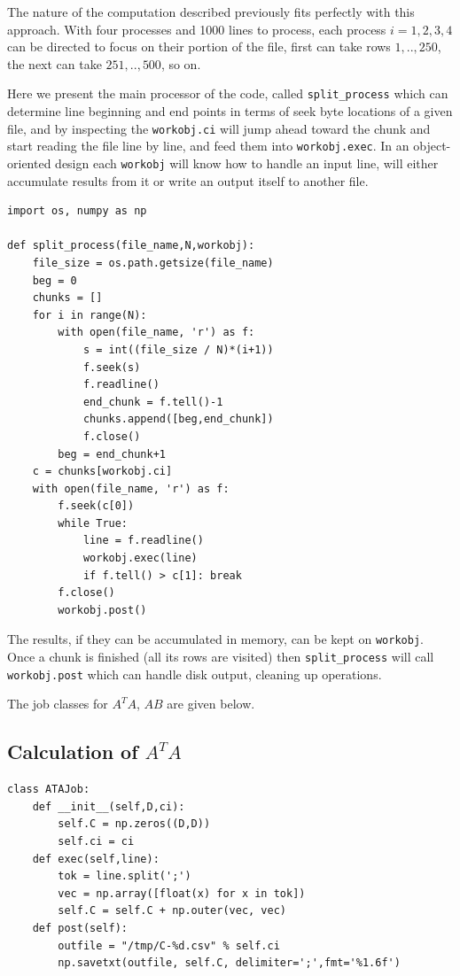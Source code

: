 \documentclass{article}
\begin{document}
The nature of the computation described previously fits perfectly with this
approach. With four processes and 1000 lines to process, each process
$i=1,2,3,4$ can be directed to focus on their portion of the file, first can
take rows $1,..,250$, the next can take $251,..,500$, so on.

Here we present the main processor of the code, called \verb!split_process!
which can determine line beginning and end points in terms of seek byte
locations of a given file, and by inspecting the \verb!workobj.ci! will
jump ahead toward the chunk and start reading the file line by line, and
feed them into \verb!workobj.exec!. In an object-oriented design each
\verb!workobj! will know how to handle an input line, will either accumulate
results from it or write an output itself to another file.

\begin{verbatim}
import os, numpy as np

def split_process(file_name,N,workobj):
    file_size = os.path.getsize(file_name)
    beg = 0
    chunks = []
    for i in range(N):
        with open(file_name, 'r') as f:
            s = int((file_size / N)*(i+1))
            f.seek(s)
            f.readline()
            end_chunk = f.tell()-1
            chunks.append([beg,end_chunk])
            f.close()
        beg = end_chunk+1
    c = chunks[workobj.ci]
    with open(file_name, 'r') as f:
        f.seek(c[0])
        while True:
            line = f.readline()
            workobj.exec(line)
            if f.tell() > c[1]: break
        f.close()
        workobj.post()
\end{verbatim}

The results, if they can be accumulated in memory, can be kept on
\verb!workobj!. Once a chunk is finished (all its rows are visited) then
\verb!split_process! will call \verb!workobj.post! which can handle disk output,
cleaning up operations.

The job classes for $A^T A$, $AB$ are given below.

\subsection{Calculation of $A^T A$}

\begin{verbatim}
class ATAJob:
    def __init__(self,D,ci):
        self.C = np.zeros((D,D))
        self.ci = ci
    def exec(self,line):
        tok = line.split(';')
        vec = np.array([float(x) for x in tok])
        self.C = self.C + np.outer(vec, vec)
    def post(self):
        outfile = "/tmp/C-%d.csv" % self.ci
        np.savetxt(outfile, self.C, delimiter=';',fmt='%1.6f')
\end{verbatim}
\end{document}

